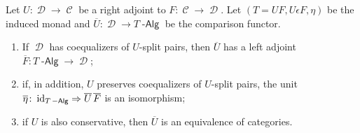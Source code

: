 \documentclass[a4paper,11pt,oneside,openany]{scrbook}
\DeclareMathOperator{\Alg}{-\mathsf{Alg}}
\DeclareMathOperator{\C}{\mathcal{C}}
\DeclareMathOperator{\D}{\mathcal{D}}
\DeclareMathOperator{\id}{id}
\theoremstyle{definition}
\theoremstyle{definition}
\begin{document}
\begin{teo}[Beck]\label{Beck} Let $U\colon\D\to\C$ be a right adjoint to $F\colon\C\to\D$. Let $(T=UF, U\epsilon F, \eta)$ be the induced monad and $\overline{U}\colon\D\to T\Alg$ be the comparison functor. 
	\begin{enumerate}
		\item If $\D$ has coequalizers of $U$-split pairs, then $\overline{U}$ has a left adjoint $\overline{F}\colon T\Alg\to\D$;
		\item if, in addition, $U$ preserves coequalizers of $U$-split pairs, the unit $\overline{\eta}\colon\id_{T\Alg}\Rightarrow\overline{U}\hspace{.5mm} \overline{F}$ is an isomorphism;
		\item if $U$ is also conservative, then $\overline{U}$ is an equivalence of categories.
	\end{enumerate}
	\end{teo}
\end{document}
